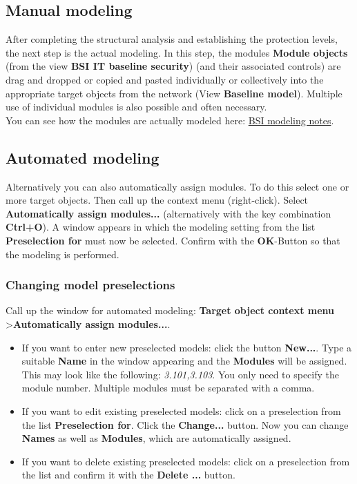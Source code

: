 \documentclass[a4paper,10pt]{book}
\begin{document}
\subsection{Manual modeling}
After completing the structural analysis and establishing the protection levels, the next step is the actual modeling. In this step,
the modules \textbf{Module objects} (from the view \textbf{BSI IT baseline security}) (and their associated controls) are drag and dropped or copied and pasted
individually or collectively into the appropriate target objects from the network (View \textbf{Baseline model}).
Multiple use of individual modules is also possible and often necessary.
\newline\\
You can see how the modules are actually modeled here:
\href{https://www.bsi.bund.de/ContentBSI/grundschutz/kataloge/allgemein/modellierung/02001.html}{BSI modeling notes}.

\subsection{Automated modeling}
Alternatively you can also automatically assign modules. To do this select one or more target objects.
Then call up the context menu (right-click). Select \textbf{Automatically assign modules...}
(alternatively with the key combination \textbf{Ctrl+O}). A window appears in which the modeling setting from the list
\textbf{Preselection for} must now be selected. Confirm with the \textbf{OK}-Button so that the modeling is performed.

\subsubsection{Changing model preselections}
Call up the window for automated modeling: \textbf{Target object context menu} \textgreater \textbf{Automatically assign modules...}.
\begin{itemize}
 \item If you want to enter new preselected models: click the button \textbf{New...}. Type a suitable \textbf{Name} in the window appearing and the \textbf{Modules} will be assigned. This may look like the following: \textit{3.101,3.103}. You only need to specify the module number. Multiple modules must be separated with a comma.
 \item If you want to edit existing preselected models: click on a preselection from the list \textbf{Preselection for}. Click the \textbf{Change...} button. Now you can change \textbf{Names} as well as \textbf{Modules}, which are automatically assigned.
 \item If you want to delete existing preselected models: click on a preselection from the list and confirm it with the \textbf{Delete ...} button.
\end{itemize}
\end{document}

